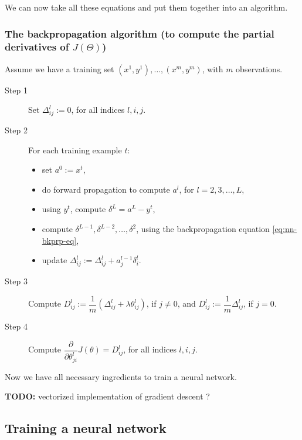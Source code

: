 \documentclass[a4paper,11pt]{report}
\begin{document}
We can now take all these equations and put them together into an algorithm.

\subsubsection*{The backpropagation algorithm (to compute the partial derivatives of $J(\Theta)$)}

Assume we have a training set ${(x^1,y^1), \ldots, (x^m,y^m)}$, with $m$ observations.
\begin{description}
\item[Step 1]{Set $\Delta^{l}_{ij}:= 0$, for all indices $l, i, j$.}

\item[Step 2] {For each training example $t$:

\begin{itemize}
\item set $a^{0} := x^{t}$,
\item do forward propagation to compute $a^{l}$, for $l=2,3,\ldots,L$,
\item using $y^{t}$, compute $\delta^{L} = a^{L} - y^{t}$,
\item compute $\delta^{L-1}, \delta^{L-2},\ldots, \delta^{2}$, using the backpropagation equation \eqref{eq:nn-bkprp-eq},
\item update $\Delta^{l}_{ij} := \Delta^{l}_{ij} + a_j^{l-1} \delta_i^{l}$.
\end{itemize}
}
\item[Step 3]{Compute $D^l_{ij} := \dfrac{1}{m}\left(\Delta^l_{ij} + \lambda\theta^l_{ij} \right)$, if $j\neq 0$, and $D^{l}_{ij} := \dfrac{1}{m}\Delta^{l}_{ij}$, if $j = 0$.}

\item[Step 4]{Compute $\dfrac{\partial}{\partial\theta^l_{ji}}J(\theta) = D^l_{ij}$, for all indices $l, i, j$.}
\end{description}

Now we have all necessary ingredients to train a neural network.

\textbf{TODO:} vectorized implementation of gradient descent ?

\subsection*{Training a neural network}
\end{document}
